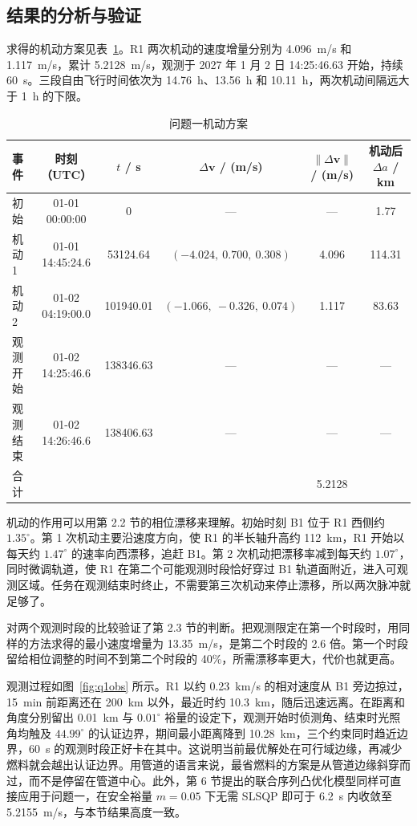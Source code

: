 \subsection{结果的分析与验证}

求得的机动方案见表~\ref{tab:q1plan}。R1 两次机动的速度增量分别为 4.096~m/s 和 1.117~m/s，累计 5.2128~m/s，观测于 2027 年 1 月 2 日 14:25:46.63 开始，持续 60~s。三段自由飞行时间依次为 14.76~h、13.56~h 和 10.11~h，两次机动间隔远大于 1~h 的下限。

\begin{table}[!htb]
  \centering
  \caption{问题一机动方案}
  \label{tab:q1plan}
  \setlength{\tabcolsep}{3pt}
  \begin{tabular}{lccccc}
    \toprule
    事件 & 时刻（UTC） & $t$ / s & $\Delta\bm v$ / (m/s) & $\|\Delta\bm v\|$ / (m/s) & 机动后 $\Delta a$ / km \\
    \midrule
    初始 & 01-01 00:00:00 & 0 & — & — & 1.77 \\
    机动 1 & 01-01 14:45:24.6 & 53124.64 & $(-4.024,\ 0.700,\ 0.308)$ & 4.096 & 114.31 \\
    机动 2 & 01-02 04:19:00.0 & 101940.01 & $(-1.066,\ -0.326,\ 0.074)$ & 1.117 & 83.63 \\
    观测开始 & 01-02 14:25:46.6 & 138346.63 & — & — & — \\
    观测结束 & 01-02 14:26:46.6 & 138406.63 & — & — & — \\
    \midrule
    合计 & & & & 5.2128 & \\
    \bottomrule
  \end{tabular}
\end{table}

机动的作用可以用第 2.2 节的相位漂移来理解。初始时刻 B1 位于 R1 西侧约 $1.35^\circ$。第 1 次机动主要沿速度方向，使 R1 的半长轴升高约 112~km，R1 开始以每天约 $1.47^\circ$ 的速率向西漂移，追赶 B1。第 2 次机动把漂移率减到每天约 $1.07^\circ$，同时微调轨道，使 R1 在第二个可能观测时段恰好穿过 B1 轨道面附近，进入可观测区域。任务在观测结束时终止，不需要第三次机动来停止漂移，所以两次脉冲就足够了。

对两个观测时段的比较验证了第 2.3 节的判断。把观测限定在第一个时段时，用同样的方法求得的最小速度增量为 13.35~m/s，是第二个时段的 2.6 倍。第一个时段留给相位调整的时间不到第二个时段的 40\%，所需漂移率更大，代价也就更高。

观测过程如图~\ref{fig:q1obs} 所示。R1 以约 0.23~km/s 的相对速度从 B1 旁边掠过，15~min 前距离还在 200~km 以外，最近时约 10.3~km，随后迅速远离。在距离和角度分别留出 0.01~km 与 $0.01^\circ$ 裕量的设定下，观测开始时侦测角、结束时光照角均触及 $44.99^\circ$ 的认证边界，期间最小距离降到 10.28~km，三个约束同时趋近边界，60~s 的观测时段正好卡在其中。这说明当前最优解处在可行域边缘，再减少燃料就会越出认证边界。用管道的语言来说，最省燃料的方案是从管道边缘斜穿而过，而不是停留在管道中心。此外，第 6 节提出的联合序列凸优化模型同样可直接应用于问题一，在安全裕量 $m = 0.05$ 下无需 SLSQP 即可于 6.2~s 内收敛至 5.2155~m/s，与本节结果高度一致。

